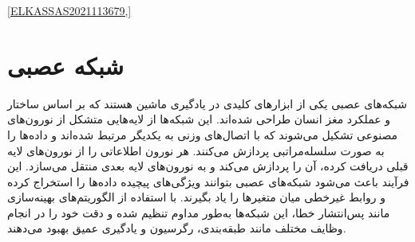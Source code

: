 \ref{ELKASSAS2021113679,}







\section{شبکه عصبی}
شبکه‌های عصبی یکی از ابزارهای کلیدی در یادگیری ماشین هستند که بر اساس ساختار و عملکرد مغز انسان طراحی شده‌اند. این شبکه‌ها از لایه‌هایی متشکل از نورون‌های مصنوعی تشکیل می‌شوند که با اتصال‌های وزنی به یکدیگر مرتبط شده‌اند و داده‌ها را به صورت سلسله‌مراتبی پردازش می‌کنند. هر نورون اطلاعاتی را از نورون‌های لایه قبلی دریافت کرده، آن را پردازش می‌کند و به نورون‌های لایه بعدی منتقل می‌سازد. این فرآیند باعث می‌شود شبکه‌های عصبی بتوانند ویژگی‌های پیچیده داده‌ها را استخراج کرده و روابط غیرخطی میان متغیرها را یاد بگیرند. با استفاده از الگوریتم‌های بهینه‌سازی مانند پس‌انتشار خطا، این شبکه‌ها به‌طور مداوم تنظیم شده و دقت خود را در انجام وظایف مختلف مانند طبقه‌بندی، رگرسیون و یادگیری عمیق بهبود می‌دهند.
